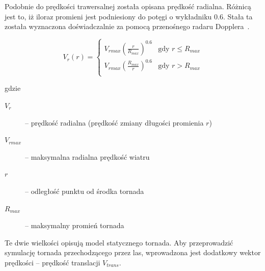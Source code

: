 Podobnie do prędkości trawersalnej została opisana prędkość radialna. Różnicą jest to, iż iloraz promieni jest podniesiony do potęgi o wykładniku $0.6$. Stała ta została wyznaczona doświadczalnie za pomocą przenośnego radaru Dopplera~\cite{hb_doppler}.

$$ V_{r}(r) =  \left\{ \begin{array}{ll}
V_{r  max}(\frac{r}{R_{max}})^{0.6} & \textrm{gdy $r \leq R_{max}$}\\
V_{r  max}(\frac{R_{max}}{r})^{0.6} & \textrm{gdy $r > R_{max}$}\\
\end{array} \right.$$

gdzie

\begin{description}
  \item[$V_{r}$] --  prędkość radialna (prędkość zmiany długości promienia $r$)
  \item[${V_{r  max}}$ ]-- maksymalna radialna prędkość wiatru
  \item[$r$ ]-- odległość punktu od środka tornada
  \item[$R_{max}$]-- maksymalny promień tornada
\end{description}

Te dwie wielkości opisują model statycznego tornada. Aby przeprowadzić symulację tornada przechodzącego przez las, wprowadzona jest dodatkowy wektor prędkości -- prędkość translacji $V_{trans}$.

